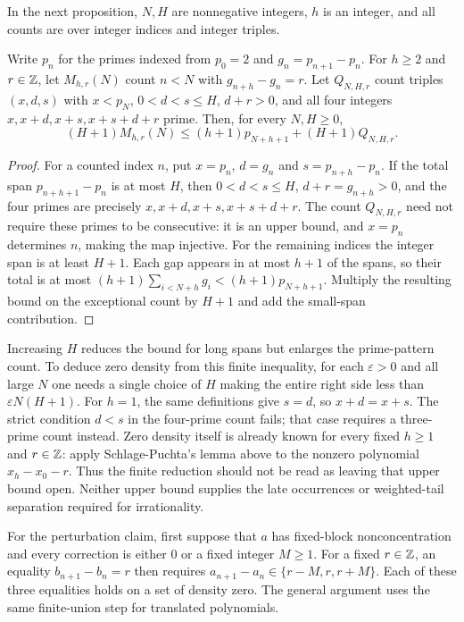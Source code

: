 \documentclass[11pt]{article}
\begin{document}
In the next proposition, $N,H$ are nonnegative integers, $h$ is an
integer, and all counts are over integer indices and integer triples.

\begin{proposition}\label{long251:res:shiftedcount}
Write $p_n$ for the primes indexed from $p_0=2$ and $g_n=p_{n+1}-p_n$.
For $h\ge2$ and $r\in\mathbb{Z}$, let $M_{h,r}(N)$ count $n<N$ with $g_{n+h}-g_n=r$.
Let $Q_{N,H,r}$ count triples $(x,d,s)$ with $x<p_N$,
$0<d<s\le H$, $d+r>0$, and all four integers
$x,x+d,x+s,x+s+d+r$ prime. Then, for every $N,H\ge0$,
\[
 (H+1)M_{h,r}(N)\le
 (h+1)p_{N+h+1}+(H+1)Q_{N,H,r}.
\]
\end{proposition}

\begin{proof}
For a counted index $n$, put $x=p_n$, $d=g_n$ and
$s=p_{n+h}-p_n$.  If the total span $p_{n+h+1}-p_n$ is at most $H$,
then $0<d<s\le H$, $d+r=g_{n+h}>0$, and the four primes are precisely
$x,x+d,x+s,x+s+d+r$.  The count $Q_{N,H,r}$ need not require these
primes to be consecutive: it is an upper bound, and $x=p_n$ determines
$n$, making the map injective.  For the remaining indices the integer
span is at least $H+1$.
Each gap appears in at most $h+1$ of the spans, so their total is at most
$(h+1)\sum_{i<N+h}g_i<(h+1)p_{N+h+1}$.  Multiply the resulting bound
on the exceptional count by $H+1$ and add the small-span contribution.
\end{proof}

Increasing $H$ reduces the bound for long spans but enlarges the
prime-pattern count.  To deduce zero density from this finite inequality,
for each $\varepsilon>0$ and all large $N$ one needs a single choice of
$H$ making the entire right side less than $\varepsilon N(H+1)$.  For $h=1$, the same definitions give $s=d$, so $x+d=x+s$.
The strict condition $d<s$ in the four-prime count fails; that case
requires a three-prime count instead.
Zero density itself is already known for every fixed $h\ge1$ and
$r\in\mathbb{Z}$: apply Schlage-Puchta's lemma above to the nonzero polynomial
$x_h-x_0-r$.  Thus the finite reduction should not be read as leaving
that upper bound open.  Neither upper bound supplies the late occurrences
or weighted-tail separation required for irrationality.

For the perturbation claim, first suppose that $a$ has fixed-block
nonconcentration and every correction is either $0$ or a fixed integer
$M\ge1$.  For a fixed $r\in\mathbb{Z}$, an equality $b_{n+1}-b_n=r$ then requires
$a_{n+1}-a_n\in\{r-M,r,r+M\}$.  Each of these three equalities holds on
a set of density zero.  The general argument uses the same finite-union
step for translated polynomials.
\end{document}

